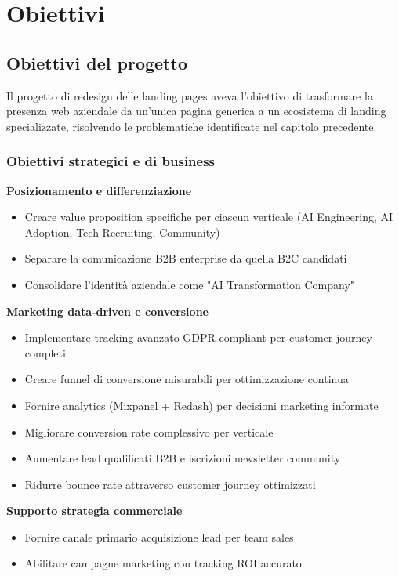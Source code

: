 \chapter{Obiettivi}

\section{Obiettivi del progetto}
Il progetto di redesign delle landing pages aveva l'obiettivo di trasformare la presenza web aziendale da un'unica pagina generica a un ecosistema di landing specializzate, risolvendo le problematiche identificate nel capitolo precedente.

\subsection{Obiettivi strategici e di business}

\textbf{Posizionamento e differenziazione}
\begin{itemize}
  \item Creare value proposition specifiche per ciascun verticale (AI Engineering, AI Adoption, Tech Recruiting, Community)
  \item Separare la comunicazione B2B enterprise da quella B2C candidati
  \item Consolidare l'identità aziendale come "AI Transformation Company"
\end{itemize}

\textbf{Marketing data-driven e conversione}
\begin{itemize}
  \item Implementare tracking avanzato GDPR-compliant per customer journey completi
  \item Creare funnel di conversione misurabili per ottimizzazione continua
  \item Fornire analytics (Mixpanel + Redash) per decisioni marketing informate
  \item Migliorare conversion rate complessivo per verticale
  \item Aumentare lead qualificati B2B e iscrizioni newsletter community
  \item Ridurre bounce rate attraverso customer journey ottimizzati
\end{itemize}

\textbf{Supporto strategia commerciale}
\begin{itemize}
  \item Fornire canale primario acquisizione lead per team sales
  \item Abilitare campagne marketing con tracking ROI accurato
\end{itemize}

